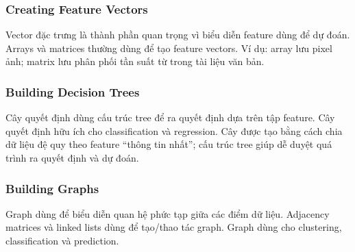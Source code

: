 \subsubsection{Creating Feature Vectors}
\begin{phuongphap}[title={Tạo vector đặc trưng}]
Vector đặc trưng là thành phần quan trọng vì biểu diễn feature dùng để dự đoán.
Arrays và matrices thường dùng để tạo feature vectors.
Ví dụ: array lưu pixel ảnh; matrix lưu phân phối tần suất từ trong tài liệu văn bản.
\end{phuongphap}

\subsubsection{Building Decision Trees}
\begin{phuongphap}[title={Xây cây quyết định}]
Cây quyết định dùng cấu trúc tree để ra quyết định dựa trên tập feature.
Cây quyết định hữu ích cho classification và regression.
Cây được tạo bằng cách chia dữ liệu đệ quy theo feature “thông tin nhất”; cấu trúc tree giúp dễ duyệt quá trình ra quyết định và dự đoán.
\end{phuongphap}

\subsubsection{Building Graphs}
\begin{phuongphap}[title={Xây dựng graph}]
Graph dùng để biểu diễn quan hệ phức tạp giữa các điểm dữ liệu.
Adjacency matrices và linked lists dùng để tạo/thao tác graph.
Graph dùng cho clustering, classification và prediction.
\end{phuongphap}